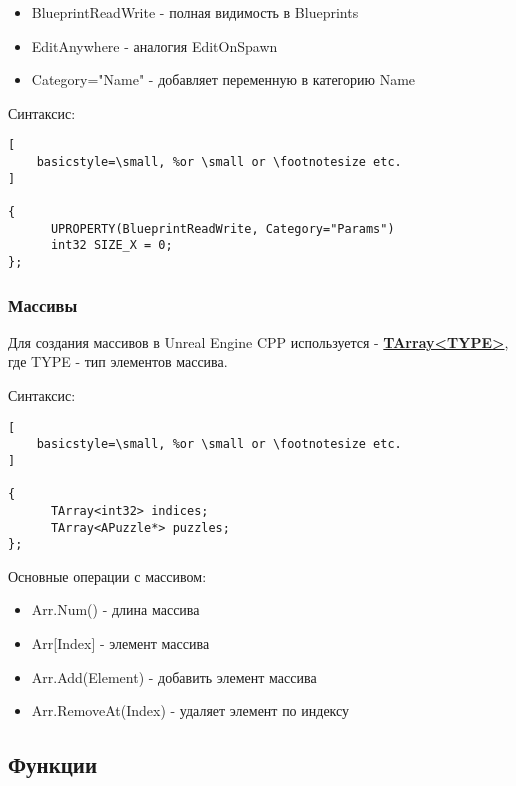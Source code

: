 \documentclass[a4paper,article,14pt]{extarticle}
\begin{document}
\begin{itemize}
\item{BlueprintReadWrite - полная видимость в Blueprints}
\item{EditAnywhere - аналогия EditOnSpawn}
\item{Category="Name" \- - добавляет переменную в категорию Name}
\end{itemize}

Синтаксис:

\begin{lstlisting}[
    basicstyle=\small, %or \small or \footnotesize etc.
]              

{
      UPROPERTY(BlueprintReadWrite, Category="Params")
      int32 SIZE_X = 0;
};

\end{lstlisting}          

\subsubsection{Массивы}

Для создания массивов в Unreal Engine CPP используется - \href{https://docs.unrealengine.com/4.26/en-US/ProgrammingAndScripting/ProgrammingWithCPP/UnrealArchitecture/TArrays/}{\textbf{TArray<TYPE>}}, где TYPE - тип элементов массива.

Синтаксис:

\begin{lstlisting}[
    basicstyle=\small, %or \small or \footnotesize etc.
]              

{
      TArray<int32> indices;
      TArray<APuzzle*> puzzles;
};

\end{lstlisting}          

Основные операции с массивом:

\begin{itemize}
\item{Arr.Num() - длина массива}
\item{Arr[Index] - элемент массива}
\item{Arr.Add(Element) - добавить элемент массива}
\item{Arr.RemoveAt(Index) - удаляет элемент по индексу}
\end{itemize}

\subsection{Функции}
\end{document}
